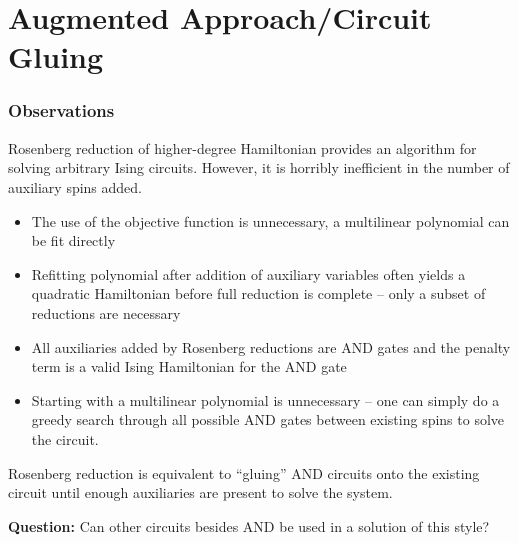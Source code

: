 \documentclass[8pt, mathserif, notheorems]{beamer}
\begin{document}
\section{Augmented Approach/Circuit Gluing}
\begin{frame}[t]\frametitle{Observations}
  Rosenberg reduction of higher-degree Hamiltonian provides an algorithm for solving arbitrary Ising circuits. However, it is horribly inefficient in the number of auxiliary spins added.

  \pause
  \begin{itemize}
    \item The use of the objective function is unnecessary, a multilinear polynomial can be fit directly
      \pause
    \item Refitting polynomial after addition of auxiliary variables often yields a quadratic Hamiltonian before full reduction is complete -- only a subset of reductions are necessary
      \pause
    \item All auxiliaries added by Rosenberg reductions are AND gates and the penalty term is a valid Ising Hamiltonian for the AND gate
      \pause
    \item Starting with a multilinear polynomial is unnecessary -- one can simply do a greedy search through all possible AND gates between existing spins to solve the circuit.
  \end{itemize}
  \pause
  Rosenberg reduction is equivalent to ``gluing'' AND circuits onto the existing circuit until enough auxiliaries are present to solve the system.

  \bigskip

  \textbf{Question:} Can other circuits besides AND be used in a solution of this style?
\end{frame}
\end{document}
